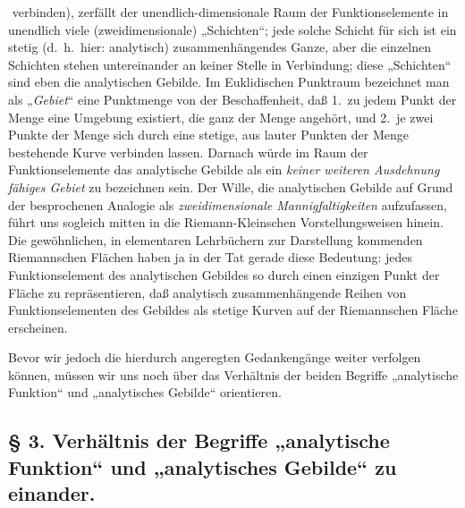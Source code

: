 \documentclass{article}
\begin{document}
﻿
verbinden), zerfällt der unendlich-dimensionale Raum der Funktionselemente in unendlich viele (zweidimensionale) „Schichten“; jede solche Schicht für sich ist ein stetig (d.\ h.\ hier: analytisch) zusammenhängendes Ganze, aber die einzelnen Schichten stehen untereinander an keiner Stelle in Verbindung; diese „Schichten“ sind eben die analytischen Gebilde. Im Euklidischen Punktraum bezeichnet man als „\emph{Gebiet}“ eine Punktmenge von der Beschaffenheit, daß 1.\ zu jedem Punkt der Menge eine Umgebung existiert, die ganz der Menge angehört, und 2.\ je zwei Punkte der Menge sich durch eine stetige, aus lauter Punkten der Menge bestehende Kurve verbinden lassen. Darnach würde im Raum der Funktionselemente das analytische Gebilde als ein \emph{keiner weiteren Ausdehnung fähiges Gebiet} zu bezeichnen sein. Der Wille, die analytischen Gebilde auf Grund der besprochenen Analogie als \emph{zweidimensionale Mannigfaltigkeiten} aufzufassen, führt uns sogleich mitten in die Riemann-Kleinschen Vorstellungsweisen hinein. Die gewöhnlichen, in elementaren Lehrbüchern zur Darstellung kommenden Riemannschen Flächen haben ja in der Tat gerade diese Bedeutung: jedes Funktionselement des analytischen Gebildes so durch einen einzigen Punkt der Fläche zu repräsentieren, daß analytisch zusammenhängende Reihen von Funktionselementen des Gebildes als stetige Kurven auf der Riemannschen Fläche erscheinen.

Bevor wir jedoch die hierdurch angeregten Gedankengänge weiter verfolgen können, müssen wir uns noch über das Verhältnis der beiden Begriffe „analytische Funktion“ und „analytisches Gebilde“ orientieren.

\subsection*{§ 3. Verhältnis der Begriffe „analytische Funktion“ und „analytisches Gebilde“ zu einander.}
\end{document}
